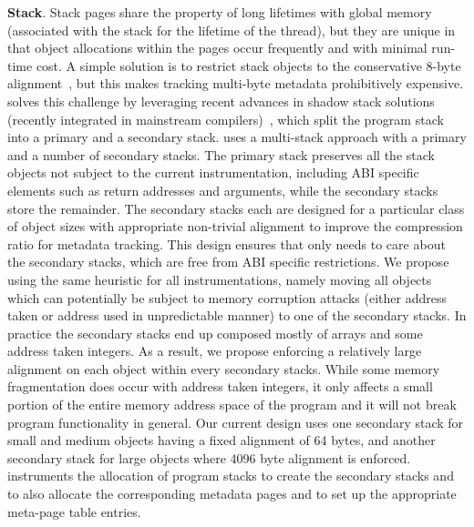 \textbf{Stack}. Stack pages share the property of long lifetimes with global memory (associated with the stack for the lifetime of the thread), but they are unique in that object allocations within the pages occur frequently and with minimal run-time cost. A simple solution is to restrict stack objects to the conservative 8-byte alignment~\cite{akritidis2008preventing},
but this makes tracking multi-byte metadata
prohibitively expensive. \projectname{} solves this challenge by leveraging recent advances
in shadow stack solutions (recently integrated in mainstream compilers)~\cite{kuznetsov2014cpi}, which split the program stack into a primary and a secondary stack.
\projectname{} uses a multi-stack approach with a primary and a number of secondary stacks.
The primary stack preserves all the stack objects not subject to
the current instrumentation, including ABI specific elements such as
return addresses and arguments, while the secondary stacks store the remainder. The secondary stacks each are designed for a particular
class of object sizes with appropriate non-trivial alignment to improve the compression ratio for metadata tracking.
This design ensures that \projectname{} only needs to care about the secondary stacks, which are free from ABI specific restrictions.
We propose using the same heuristic for all instrumentations, namely moving all objects which can potentially be subject to memory
corruption attacks (either address taken or address used in unpredictable manner) to one of the secondary stacks. In practice the secondary stacks end up composed
mostly of arrays and some address taken integers. As a result, we propose enforcing a relatively
large alignment on each object within every secondary stacks. While some memory fragmentation
does occur with address taken integers, it only affects a small portion of the entire
memory address space of the program and it will not break program functionality in general.
Our current design uses one secondary stack for small and medium objects having a fixed alignment of 64 bytes,
and another secondary stack for large objects where 4096 byte alignment is enforced.
\projectname{} instruments the allocation of program stacks to create the secondary stacks
and to also allocate the corresponding metadata pages and to set up the appropriate meta-page table entries.

